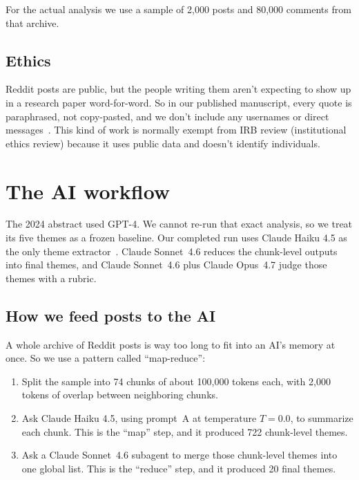 \documentclass[11pt]{article}
\begin{document}
For the actual analysis we use a sample of 2{,}000 posts and
80{,}000 comments from that archive.

\subsection{Ethics}

Reddit posts are public, but the people writing them aren't expecting
to show up in a research paper word-for-word. So in our published
manuscript, every quote is paraphrased, not copy-pasted, and we don't
include any usernames or direct messages~\cite{norori2021addressing}.
This kind of work is normally exempt from IRB review (institutional
ethics review) because it uses public data and doesn't identify
individuals.

\section{The AI workflow}

The 2024 abstract used GPT-4. We cannot re-run that exact analysis, so
we treat its five themes as a frozen baseline. Our completed run uses
Claude Haiku 4.5 as the only theme extractor~\cite{anthropic_claude_haiku}.
Claude Sonnet~4.6 reduces the chunk-level outputs into final themes,
and Claude Sonnet~4.6 plus Claude Opus~4.7 judge those themes with a
rubric.

\subsection{How we feed posts to the AI}

A whole archive of Reddit posts is way too long to fit into an AI's
memory at once. So we use a pattern called ``map-reduce'':

\begin{enumerate}
  \item Split the sample into 74 chunks of about 100{,}000 tokens each,
    with 2{,}000 tokens of overlap between neighboring chunks.
  \item Ask Claude Haiku 4.5, using prompt~A at temperature $T=0.0$,
    to summarize each chunk. This is the ``map'' step, and it produced
    722 chunk-level themes.
  \item Ask a Claude Sonnet~4.6 subagent to merge those chunk-level
    themes into one global list. This is the ``reduce'' step, and it
    produced 20 final themes.
\end{enumerate}
\end{document}
